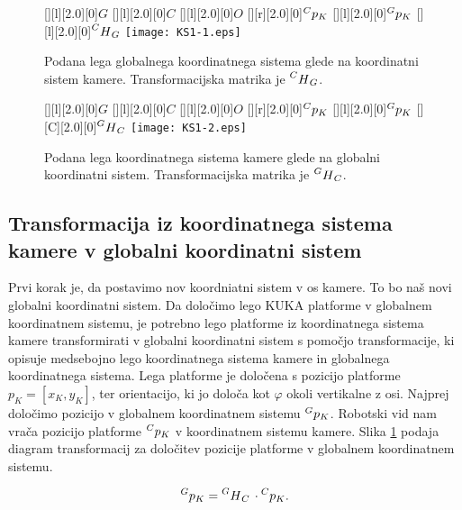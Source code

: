\begin{figure}[ht]
\centering
\begin{minipage}[b]{0.35\linewidth}
\centering
{}[][l][2.0][0]{$G$}
[][l][2.0][0]{$C$}
[][l][2.0][0]{$O$}
[][r][2.0][0]{$\prescript{C}{}p_K$}
[][l][2.0][0]{$\prescript{G}{}p_K$}
[][l][2.0][0]{$\prescript{C}{}H_G$}
\texttt{[image: KS1-1.eps]}
\caption{Podana lega globalnega koordinatnega sistema glede na koordinatni sistem kamere. Transformacijska matrika je $\prescript{C}{}H_G$.}
\label{fig:TransfKamGlob}
\end{minipage}
\hspace{1.5cm}
\begin{minipage}[b]{0.35\linewidth}
\centering
{}[][l][2.0][0]{$G$}
[][l][2.0][0]{$C$}
[][l][2.0][0]{$O$}
[][r][2.0][0]{$\prescript{C}{}p_K$}
[][l][2.0][0]{$\prescript{G}{}p_K$}
[][C][2.0][0]{$\prescript{G}{}H_C$}
\texttt{[image: KS1-2.eps]}
\caption{Podana lega koordinatnega sistema kamere glede na globalni koordinatni sistem. Transformacijska matrika je $\prescript{G}{}H_C$.}
\label{fig:TransfGlobKam}
\end{minipage}
\end{figure}

\subsection{Transformacija iz koordinatnega sistema kamere v globalni koordinatni sistem}
Prvi korak je, da postavimo nov koordniatni sistem v os kamere. To bo naš novi globalni koordinatni sistem. Da določimo lego KUKA platforme v globalnem koordinatnem sistemu, je potrebno lego platforme iz koordinatnega sistema kamere transformirati v globalni koordinatni sistem s pomočjo transformacije, ki opisuje medsebojno lego koordinatnega sistema kamere in globalnega koordinatnega sistema. Lega platforme je določena s pozicijo platforme $p_K = [x_K, y_K]$, ter orientacijo, ki jo določa kot $\varphi$ okoli vertikalne z osi. Najprej določimo pozicijo v globalnem koordinatnem sistemu $\prescript{G}{}p_K$. Robotski vid nam vrača pozicijo platforme $\prescript{C}{}p_K$ v koordinatnem sistemu kamere. Slika \ref{fig:TransfGlobKam} podaja diagram transformacij za določitev pozicije platforme v globalnem koordinatnem sistemu.

\begin{equation}
    \prescript{G}{}p_K = \prescript{G}{}H_C \, \cdot \prescript{C}{}p_K.
\end{equation}

